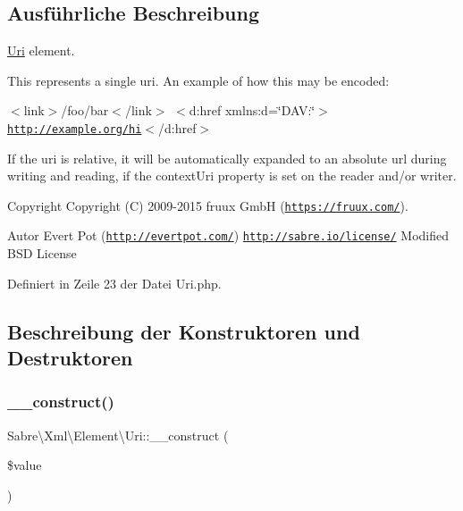\subsection{Ausführliche Beschreibung}
\mbox{\hyperlink{class_sabre_1_1_xml_1_1_element_1_1_uri}{Uri}} element.

This represents a single uri. An example of how this may be encoded\+:

$<$link$>$/foo/bar$<$/link$>$ $<$d\+:href xmlns\+:d=\char`\"{}\+D\+A\+V\+:\char`\"{}$>$\href{http://example.org/hi}{\tt http\+://example.\+org/hi}$<$/d\+:href$>$

If the uri is relative, it will be automatically expanded to an absolute url during writing and reading, if the context\+Uri property is set on the reader and/or writer.

\begin{DoxyCopyright}{Copyright}
Copyright (C) 2009-\/2015 fruux GmbH (\href{https://fruux.com/}{\tt https\+://fruux.\+com/}). 
\end{DoxyCopyright}
\begin{DoxyAuthor}{Autor}
Evert Pot (\href{http://evertpot.com/}{\tt http\+://evertpot.\+com/})  \href{http://sabre.io/license/}{\tt http\+://sabre.\+io/license/} Modified B\+SD License 
\end{DoxyAuthor}


Definiert in Zeile 23 der Datei Uri.\+php.



\subsection{Beschreibung der Konstruktoren und Destruktoren}
\mbox{\label{class_sabre_1_1_xml_1_1_element_1_1_uri_ae222f389b3b482f203c1c751a6a42fde}} 
\subsubsection{\texorpdfstring{\+\_\+\+\_\+construct()}{\_\_construct()}}
{\footnotesize\ttfamily Sabre\textbackslash{}\+Xml\textbackslash{}\+Element\textbackslash{}\+Uri\+::\+\_\+\+\_\+construct (\begin{DoxyParamCaption}\item[{}]{\$value }\end{DoxyParamCaption})}

